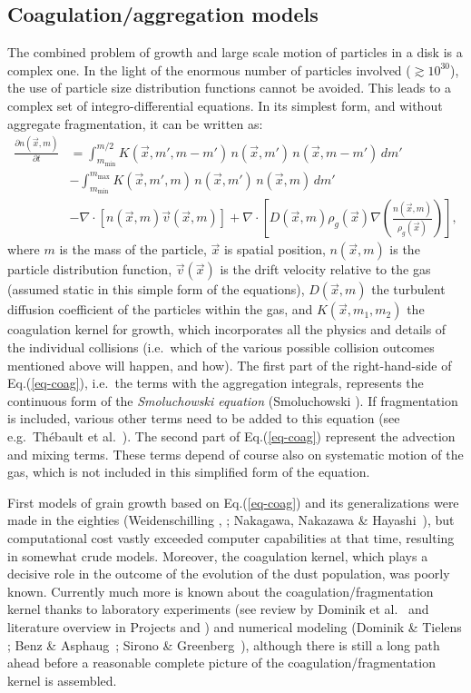 \subsection{Coagulation/aggregation models}
The combined problem of growth and large scale motion of particles in a disk
is a complex one. In the light of the enormous number of particles involved
($\gtrsim 10^{30}$), the use of particle size distribution functions cannot be
avoided. This leads to a complex set of integro-differential equations. In
its simplest form, and without aggregate fragmentation, it can be written as: 
\begin{equation}\label{eq-coag}
\begin{split}
\frac{\partial n(\vec x,m)}{\partial t} &= 
\int_{m_\mathrm{min}}^{m/2}
K(\vec x,m',m-m')\,n(\vec x,m')\,n(\vec x,m-m')\,dm'  \\
& -\int_{m_\mathrm{min}}^{m_{\mathrm{max}}}
K(\vec x,m',m)\,n(\vec x,m')\,n(\vec x,m)\,dm'\\
& - \nabla \cdot [n(\vec x,m) \vec v(\vec x,m)] 
+ \nabla \cdot \left[D(\vec x,m)\rho_g(\vec x)
\nabla \left( \frac{n(\vec x,m)}{\rho_g(\vec x)} \right)\right] ,
\end{split}
\end{equation}
where $m$ is the mass of the particle, $\vec x$ is spatial position, $n(\vec
x,m)$ is the particle distribution function, $\vec v(\vec x)$ is the drift
velocity relative to the gas (assumed static in this simple form of the
equations), $D(\vec x,m)$ the turbulent diffusion coefficient of the
particles within the gas, and $K(\vec x,m_1,m_2)$ the coagulation kernel for
growth, which incorporates all the physics and details of the individual
collisions (i.e.~which of the various possible collision outcomes mentioned
above will happen, and how).  The first part of the right-hand-side of
Eq.(\ref{eq-coag}), i.e.~the terms with the aggregation integrals,
represents the continuous form of the {\em Smoluchowski equation}
(Smoluchowski ). If fragmentation is included, various other terms
need to be added to this equation (see e.g.~Th\'ebault et al.\
). The second part of Eq.(\ref{eq-coag}) represent the advection
and mixing terms. These terms depend of course also on systematic motion of
the gas, which is not included in this simplified form of the equation.

First models of grain growth based on Eq.(\ref{eq-coag}) and its
generalizations were made in the eighties (Weidenschilling ,
\cit{1984}; Nakagawa, Nakazawa \& Hayashi~\cit{1981}), but computational
cost vastly exceeded computer capabilities at that time, resulting in
somewhat crude models. Moreover, the coagulation kernel, which plays a
decisive role in the outcome of the evolution of the dust population, was
poorly known. Currently much more is known about the
coagulation/fragmentation kernel thanks to laboratory experiments (see
review by Dominik et al.~\cit{2006} and literature overview in Projects
\projblum{} and \projwurm{}) and numerical modeling (Dominik \& Tielens
\cit{1997}; Benz \& Asphaug~\cit{1994}; Sirono \& Greenberg~\cit{2000}),
although there is still a long path ahead before a reasonable complete
picture of the coagulation/fragmentation kernel is assembled.


